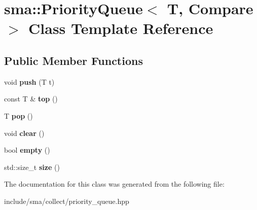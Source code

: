 \hypertarget{classsma_1_1PriorityQueue}{\section{sma\-:\-:Priority\-Queue$<$ T, Compare $>$ Class Template Reference}
\label{classsma_1_1PriorityQueue}
}
\subsection*{Public Member Functions}
\begin{DoxyCompactItemize}
\item 
\hypertarget{classsma_1_1PriorityQueue_abcf078fdb37467e2ee5f086067d80086}{void {\bfseries push} (T t)}\label{classsma_1_1PriorityQueue_abcf078fdb37467e2ee5f086067d80086}

\item 
\hypertarget{classsma_1_1PriorityQueue_a7ff1d4e51f7fd1b8efd536922125562d}{const T \& {\bfseries top} ()}\label{classsma_1_1PriorityQueue_a7ff1d4e51f7fd1b8efd536922125562d}

\item 
\hypertarget{classsma_1_1PriorityQueue_aa916496c6b939f8928ce397e6c9a5dab}{T {\bfseries pop} ()}\label{classsma_1_1PriorityQueue_aa916496c6b939f8928ce397e6c9a5dab}

\item 
\hypertarget{classsma_1_1PriorityQueue_aa48e5747f72337438d78361105e71550}{void {\bfseries clear} ()}\label{classsma_1_1PriorityQueue_aa48e5747f72337438d78361105e71550}

\item 
\hypertarget{classsma_1_1PriorityQueue_a21145bafaaf2514f3377968983bea486}{bool {\bfseries empty} ()}\label{classsma_1_1PriorityQueue_a21145bafaaf2514f3377968983bea486}

\item 
\hypertarget{classsma_1_1PriorityQueue_abd675a58e8147e77e7bde7a8a829d384}{std\-::size\-\_\-t {\bfseries size} ()}\label{classsma_1_1PriorityQueue_abd675a58e8147e77e7bde7a8a829d384}

\end{DoxyCompactItemize}


The documentation for this class was generated from the following file\-:\begin{DoxyCompactItemize}
\item 
include/sma/collect/priority\-\_\-queue.\-hpp\end{DoxyCompactItemize}
